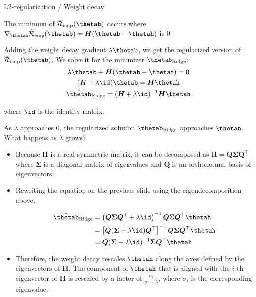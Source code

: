 \begin{vbframe}{L2-regularization / Weight decay}
\framebreak

\normalsize

The minimum of $\mathcal{\tilde R}_{\text{emp}}(\thetab)$ occurs where $\nabla_{\thetab}\mathcal{\tilde R}_{\text{emp}}(\thetab) = \bm{H}(\thetab - \thetah)$ is $0$.

\lz

Adding the weight decay gradient $\lambda \thetab$, we get the regularized version of $\mathcal{\tilde R}_{\text{emp}}(\thetab)$. We solve it for the minimizer $\hat{\thetab}_{\text{Ridge}}$:
\begin{gather*}
  \lambda \thetab + \bm{H}(\thetab - \thetah) = 0\\
      (\bm{H} + \lambda \id) \thetab = \bm{H} \thetah \\
      \hat{\thetab}_{\text{Ridge}} = (\bm{H} + \lambda \id)^{-1}\bm{H} \thetah
\end{gather*}

where $\id$ is the identity matrix.

\lz

As $\lambda$ approaches $0$, the regularized solution $\hat{\thetab}_{\text{Ridge}}$ approaches $\thetah$. What happens as $\lambda$ grows?

\framebreak

  \begin{itemize}
    \item Because $\bm{H}$ is a real symmetric matrix, it can be decomposed as $\bm{H} = \bm{Q} \bm{\Sigma} \bm{Q}^\top$ where $\bm{\Sigma}$ is a diagonal matrix of eigenvalues and $\bm{Q}$ is an orthonormal basis of eigenvectors.
    \item Rewriting the equation on the previous slide using the eigendecomposition above,

  \begin{equation*}
    \begin{aligned} 
    \hat{\thetab}_{\text{Ridge}} &=\left(\bm{Q} \bm{\Sigma} \bm{Q}^{\top}+\lambda \id\right)^{-1} \bm{Q} \bm{\Sigma} \bm{Q}^{\top} \thetah \\ 
              &=\left[\bm{Q}(\bm{\Sigma}+\lambda \id) \bm{Q}^{\top}\right]^{-1} \bm{Q} \bm{\Sigma} \bm{Q}^{\top} \thetah \\ 
              &=\bm{Q}(\bm{\Sigma} + \lambda \id)^{-1} \bm{\Sigma} \bm{Q}^{\top} \thetah 
    \end{aligned}
  \end{equation*}
    \item Therefore, the weight decay rescales $\thetah$ along the axes defined by the eigenvectors of $\bm{H}$. The component of $\thetah$ that is aligned with the $i$-th eigenvector of $\bm{H}$ is rescaled by a factor of $\frac{\sigma_i}{\sigma_i + \lambda}$, where $\sigma_i$ is the corresponding eigenvalue.
    

\end{itemize}
\end{vbframe}
